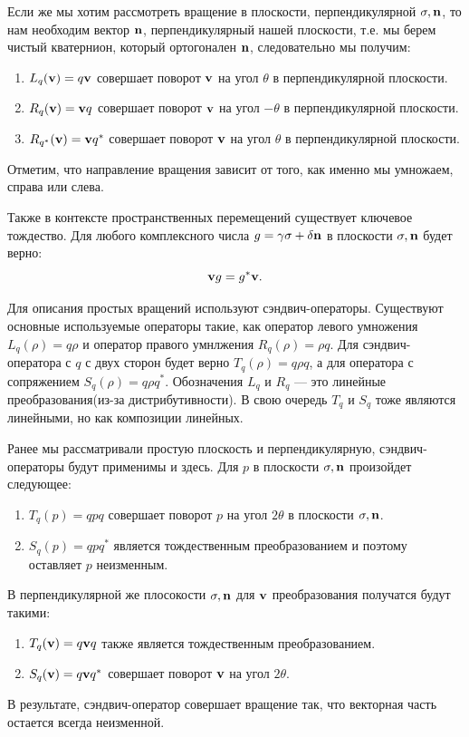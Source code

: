 Если же мы хотим рассмотреть вращение в плоскости, перпендикулярной $\sigma, \vb{n}$, то нам необходим вектор $\vb{n}$, перпендикулярный нашей плоскости, т.е. мы берем чистый кватернион, который ортогонален $\vb{n}$, следовательно мы получим:
\begin{enumerate}
    \item $L_{q}(\vb{v}) = q \vb{v}$ совершает поворот $\vb{v}$ на угол $\theta$ в перпендикулярной плоскости.
    \item $R_{q}(\vb{v}) = \vb{v} q$ совершает поворот $\vb{v}$ на угол $-\theta$ в перпендикулярной плоскости.
    \item $R_{q^*}(\vb{v}) = \vb{v} q^*$ совершает поворот $\vb{v}$ на угол $\theta$ в перпендикулярной плоскости.
\end{enumerate}
Отметим, что направление вращения зависит от того, как именно мы умножаем, справа или слева.

Также в контексте пространственных перемещений существует ключевое тождество. Для любого комплексного числа $g = \gamma\sigma + \delta\vb{n}$ в плоскости $\sigma, \vb{n}$ будет верно:
\begin{equation*}
    \vb{v} g = g^* \vb{v}.
\end{equation*}

Для описания простых вращений используют сэндвич-операторы. Существуют основные используемые операторы такие, как оператор левого умножения $L_q(\rho) = q \rho$ и оператор правого умнлжения $R_q(\rho) = \rho q$. Для сэндвич-оператора с $q$ с двух сторон будет верно $T_q(\rho) = q \rho q$, а для оператора с сопряжением $S_q(\rho) = q \rho q^*$. Обозначения $L_q$ и $R_q$ --- это линейные преобразования(из-за дистрибутивности). В свою очередь $T_q$ и $S_q$ тоже являются линейными, но как композиции линейных.

Ранее мы рассматривали простую плоскость и перпендикулярную, сэндвич-операторы будут применимы и здесь. Для $p$ в плоскости $\sigma, \vb{n}$ произойдет следующее:
\begin{enumerate}
    \item $T_q(p) = q p q$ совершает поворот $p$ на угол $2\theta$ в плоскости $\sigma, \vb{n}$.
    \item $S_q(p) = q p q^*$ является тождественным преобразованием и поэтому оставляет $p$ неизменным.
\end{enumerate}

В перпендикулярной же плосокости $\sigma, \vb{n}$ для $\vb{v}$ преобразования получатся будут такими:
\begin{enumerate}
    \item $T_q(\vb{v}) = q \vb{v} q$ также является тождественным преобразованием.
    \item $S_q(\vb{v}) = q \vb{v} q^*$ совершает поворот $\vb{v}$ на угол $2\theta$.
\end{enumerate}
В результате, сэндвич-оператор совершает вращение так, что векторная часть остается всегда неизменной.

